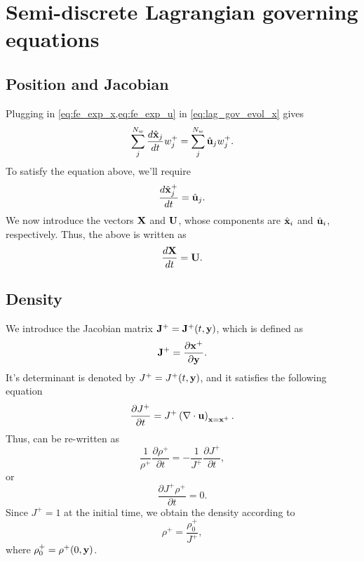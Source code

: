 \documentclass[11pt]{report}
\begin{document}
\section{Semi-discrete Lagrangian governing equations}
\subsection{Position and Jacobian}
Plugging in \cref{eq:fe_exp_x,eq:fe_exp_u} in \cref{eq:lag_gov_evol_x} gives
\begin{equation}
    \sum_{j}^{N_w} \frac{d \hat{\mathbf{x}}_j}{dt} w^+_j = \sum_{j}^{N_w} \hat{\mathbf{u}}_j w^+_j.
\end{equation}
To satisfy the equation above, we'll require
\begin{equation}
    \frac{d \hat{\mathbf{x}}^+_j}{dt} = \hat{\mathbf{u}}_j.
\end{equation}
We now introduce the vectors $\mathbf{X}$ and $\mathbf{U}$, whose components are $\hat{\mathbf{x}}_i$ and $\hat{\mathbf{u}}_i$, respectively. Thus, the above is written as
\begin{equation}
    \label{eq:evol_x_semi_discrete}
    \frac{d\mathbf{X}}{dt} = \mathbf{U}.
\end{equation}

\subsection{Density}
We introduce the Jacobian matrix $\mathbf{J}^+ = \mathbf{J}^+(t,\mathbf{y})$, which is defined as 
\begin{equation}
    \mathbf{J}^+ =  \frac{\partial \mathbf{x}^+ }{ \partial \mathbf{y}}.
\end{equation}
It's determinant is denoted by $J^+ = J^+(t,\mathbf{y})$, and it satisfies the following equation
\begin{equation}
    \label{eq:evol_det_jacob}
    \frac{\partial J^+}{\partial t} = J^+ \left( \nabla \cdot \mathbf{u} \right)_{\mathbf{x} = \mathbf{x}^+}.
\end{equation}
Thus,  can be re-written as
\begin{equation}
    \frac{1}{\rho^+} \frac{\partial \rho^+}{\partial t} = -\frac{1}{J^+} \frac{\partial J^+}{\partial t},
\end{equation}
or
\begin{equation}
    \label{eq:lag_gov_evol_rho_2}
    \frac{\partial J^+ \rho^+}{\partial t} = 0.
\end{equation}
Since $J^+ = 1$ at the initial time, we obtain the density according to
\begin{equation}
    \label{eq:evol_rho_semi_discrete}
    \rho^+ = \frac{\rho^+_0}{J^+},
\end{equation}
where $\rho^+_0 = \rho^+(0,\mathbf{y})$.
\end{document}
